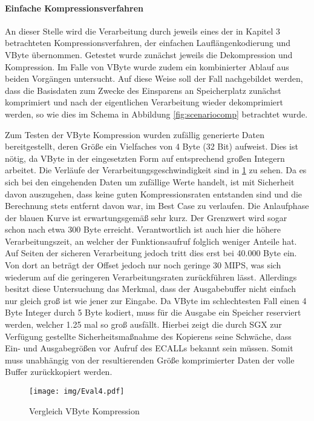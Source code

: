 \paragraph{Einfache Kompressionsverfahren}

An dieser Stelle wird die Verarbeitung durch jeweils eines der in Kapitel 3 betrachteten Kompressionsverfahren, der einfachen Lauflängenkodierung und VByte übernommen. Getestet wurde zunächst jeweils die Dekompression und Kompression. Im Falle von VByte wurde zudem ein kombinierter Ablauf aus beiden Vorgängen untersucht. Auf diese Weise soll der Fall nachgebildet werden, dass die Basisdaten zum Zwecke des Einsparens an Speicherplatz zunächst komprimiert und nach der eigentlichen Verarbeitung wieder dekomprimiert werden, so wie dies im Schema in Abbildung \ref{fig:scenariocomp} betrachtet wurde.

Zum Testen der VByte Kompression wurden zufällig generierte Daten bereitgestellt, deren Größe ein Vielfaches von 4 Byte (32 Bit) aufweist. Dies ist nötig, da VByte in der eingesetzten Form auf entsprechend großen Integern arbeitet. Die Verläufe der Verarbeitungsgeschwindigkeit sind in \ref{fig:eval4} zu sehen. Da es sich bei den eingehenden Daten um zufällige Werte handelt, ist mit Sicherheit davon auszugehen, dass keine guten Kompressionsraten entstanden sind und die Berechnung stets entfernt davon war, im Best Case zu verlaufen. Die Anlaufphase der blauen Kurve ist erwartungsgemäß sehr kurz. Der Grenzwert wird sogar schon nach etwa 300 Byte erreicht. Verantwortlich ist auch hier die höhere Verarbeitungszeit, an welcher der Funktionsaufruf folglich weniger Anteile hat. Auf Seiten der sicheren Verarbeitung jedoch tritt dies erst bei 40.000 Byte ein. Von dort an beträgt der Offset jedoch nur noch geringe 30 MIPS, was sich wiederum auf die geringeren Verarbeitungsraten zurückführen lässt. Allerdings besitzt diese Untersuchung das Merkmal, dass der Ausgabebuffer nicht einfach nur gleich groß ist wie jener zur Eingabe. Da VByte im schlechtesten Fall einen 4 Byte Integer durch 5 Byte kodiert, muss für die Ausgabe ein Speicher reserviert werden, welcher 1.25 mal so groß ausfällt. Hierbei zeigt die durch SGX zur Verfügung gestellte Sicherheitsmaßnahme des Kopierens seine Schwäche, dass Ein- und Ausgabegrößen vor Aufruf des ECALLs bekannt sein müssen. Somit muss unabhängig von der resultierenden Größe komprimierter Daten der volle Buffer zurückkopiert werden.

\begin{figure}[h]
	\texttt{[image: img/Eval4.pdf]}
	\centering
	\caption{Vergleich VByte Kompression}
	\label{fig:eval4}
\end{figure}

